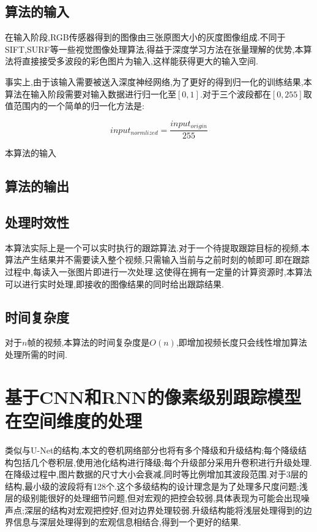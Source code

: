 \subsection{算法的输入}
\par
在输入阶段,RGB传感器得到的图像由三张原图大小的灰度图像组成.不同于SIFT\supercite{lowe1999object},SURF\supercite{bay2006surf}等一些视觉图像处理算法,得益于深度学习方法在张量理解的优势,本算法将直接接受多波段的彩色图片为输入,这样能获得更大的输入空间.
\par
事实上,由于该输入需要被送入深度神经网络,为了更好的得到归一化的训练结果,本算法在输入阶段需要对输入数据进行归一化至$[0,1]$.对于三个波段都在$[0,255]$取值范围内的一个简单的归一化方法是:
\par
\begin{equation}\label{equ:input_norm}  input_{normlized} = \frac{input_{origin}}{255}  \end{equation}
\par
本算法的输入

\subsection{算法的输出}

\subsection{处理时效性}
本算法实际上是一个可以实时执行的跟踪算法.对于一个待提取跟踪目标的视频,本算法产生结果并不需要读入整个视频,只需输入当前与之前时刻的帧即可.即在跟踪过程中,每读入一张图片即进行一次处理.这使得在拥有一定量的计算资源时,本算法可以进行实时处理,即接收的图像结果的同时给出跟踪结果.

\subsection{时间复杂度}
对于$n$帧的视频,本算法的时间复杂度是$O(n)$,即增加视频长度只会线性增加算法处理所需的时间.

\section{基于CNN和RNN的像素级别跟踪模型在空间维度的处理}

类似与U-Net的结构,本文的卷机网络部分也将有多个降级和升级结构;每个降级结构包括几个卷积层,使用池化结构进行降级;每个升级部分采用升卷积进行升级处理.在降级过程中,图片数据的尺寸大小会衰减,同时等比例增加其波段范围.对于3层的结构,最小级的波段将有128个.这个多级结构的设计理念是为了处理多尺度问题;浅层的级别能很好的处理细节问题,但对宏观的把控会较弱,具体表现为可能会出现噪声点;深层的结构对宏观把控好,但对边界处理较弱.升级结构能将浅层处理得到的边界信息与深层处理得到的宏观信息相结合,得到一个更好的结果.


